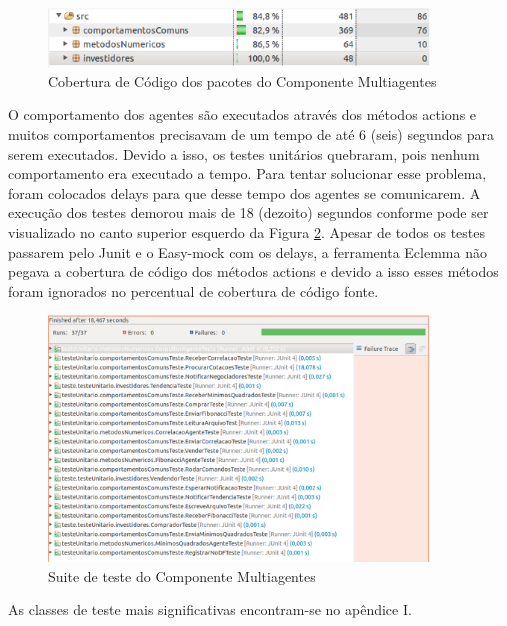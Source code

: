 \begin{figure}[H]
\centering
\includegraphics[width=0.9\textwidth]{figuras/eclemmaSMA}
\caption{Cobertura de Código dos pacotes do Componente Multiagentes}
\label{eclemmaSMA}
\end{figure}

O comportamento dos agentes são executados através dos métodos actions e muitos  comportamentos precisavam de um tempo de até 6 (seis) segundos para serem executados. Devido a isso, os testes unitários quebraram, pois nenhum comportamento era executado a tempo. Para tentar solucionar esse problema, foram colocados delays para que desse tempo dos agentes se comunicarem. A execução dos testes demorou mais de 18 (dezoito) segundos conforme pode ser visualizado no  canto superior esquerdo da Figura \ref{eclemmaTodasClasses}. Apesar de todos os testes passarem pelo Junit e o Easy-mock com os delays, a ferramenta Eclemma não pegava a cobertura de código dos métodos actions e devido a isso esses métodos foram ignorados no percentual de cobertura de código fonte.

\begin{figure}[H]
\centering
\includegraphics[width=0.9\textwidth]{figuras/eclemmaTodasClasses}
\caption{Suite de teste do Componente Multiagentes}
\label{eclemmaTodasClasses}
\end{figure}

As classes de teste mais significativas encontram-se no apêndice I.